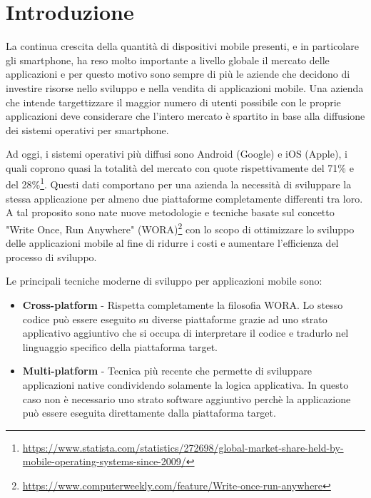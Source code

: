 
\section{Introduzione}
La continua crescita della quantità di dispositivi mobile presenti, e in particolare gli smartphone, ha reso molto importante a livello globale il mercato delle applicazioni e per questo motivo sono sempre di più le aziende che decidono di investire risorse nello sviluppo e nella vendita di applicazioni mobile. Una azienda che intende targettizzare il maggior numero di utenti possibile con le proprie applicazioni deve considerare che l'intero mercato è spartito in base alla diffusione dei sistemi operativi per smartphone. 

Ad oggi, i sistemi operativi più diffusi sono Android (Google) e iOS (Apple), i quali coprono quasi la totalità del mercato con quote rispettivamente del 71\% e del 28\%\footnote{\href{https://www.statista.com/statistics/272698/global-market-share-held-by-mobile-operating-systems-since-2009/}{https://www.statista.com/statistics/272698/global-market-share-held-by-mobile-operating-systems-since-2009/}}. Questi dati comportano per una azienda la necessità di sviluppare la stessa applicazione per almeno due piattaforme completamente differenti tra loro. A tal proposito sono nate nuove metodologie e tecniche basate sul concetto "Write Once, Run Anywhere" (WORA)\footnote{\href{https://www.computerweekly.com/feature/Write-once-run-anywhere}{https://www.computerweekly.com/feature/Write-once-run-anywhere}} con lo scopo di ottimizzare lo sviluppo delle applicazioni mobile al fine di ridurre i costi e aumentare l'efficienza del processo di sviluppo.

Le principali tecniche moderne di sviluppo per applicazioni mobile sono:
\begin{itemize}
    \item \textbf{Cross-platform} - Rispetta completamente la filosofia WORA. Lo stesso codice può essere eseguito su diverse piattaforme grazie ad uno strato applicativo aggiuntivo che si occupa di interpretare il codice e tradurlo nel linguaggio specifico della piattaforma target.
    \item \textbf{Multi-platform} - Tecnica più recente che permette di sviluppare applicazioni native condividendo solamente la logica applicativa. In questo caso non è necessario uno strato software aggiuntivo perchè la applicazione può essere eseguita direttamente dalla piattaforma target.
\end{itemize}


